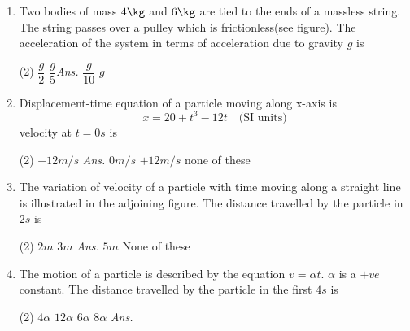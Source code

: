 \documentclass{article}
\newcommand{\ans}{\textcolor{red!95}{\textit{\quad Ans.}}}
\begin{document}
\begin{enumerate}
\item Two bodies of mass $4\kg$ and $6\kg$ are tied to the ends of a massless string. The string passes over a pulley which is frictionless(see figure). The acceleration of the system in terms of acceleration due to gravity $g$ is
\begin{center}
\end{center}
\begin{tasks}(2)
	\task $\dfrac{g}{2}$
	\task $\dfrac{g}{5}$\ans
	\task $\dfrac{g}{10}$
	\task $g$
\end{tasks}


\item Displacement-time equation of a particle moving along x-axis is 
    \[ x=20+t^3-12t \quad \text{(SI units)} \]
    velocity at $t=0 s$ is
    \begin{tasks}(2)
        \task $-12 m/s$ \ans
        \task $0 m/s$
        \task $+12 m/s$
        \task none of these
    \end{tasks}

\item The variation of velocity of a particle with time moving along a straight line is illustrated in the adjoining figure. The distance travelled by the particle in $2s$ is
    \begin{center}
    \end{center}
    \begin{tasks}(2)
            \task $2 m$
            \task $3 m$ \ans
            \task $5 m$
            \task None of these
    \end{tasks}

    \item The motion of a particle is described by the equation $v=\alpha t$. $\alpha$ is a $+ve$ constant. The distance travelled by the particle in the first $4 s$ is
    \begin{tasks}(2)
            \task $4\alpha$
            \task $12\alpha$
            \task $6\alpha$
            \task $8\alpha$ \ans
    \end{tasks}



\end{enumerate}
\end{document}
